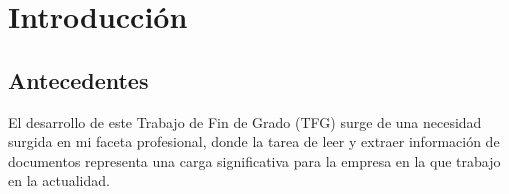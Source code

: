 \chapter{Introducción}\label{ch:chapter_1}

\section{Antecedentes}

El desarrollo de este Trabajo de Fin de Grado (TFG) surge de una necesidad surgida en mi faceta profesional, donde la
tarea de leer y extraer información de documentos representa una carga significativa para la empresa en la que trabajo
en la actualidad.

